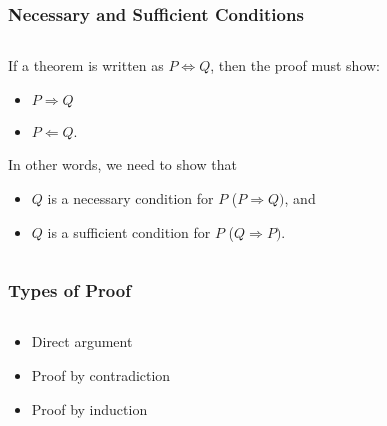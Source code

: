 \documentclass{beamer}
\begin{document}
\begin{frame}
\frametitle{Necessary and Sufficient Conditions}	
\begin{columns}
\begin{column}{0.5\textwidth}
   If a theorem is written as $P \iff Q$, then the proof must show:
   \begin{itemize}
   \item $P \Rightarrow Q$  \\
   \item $P \Leftarrow Q$.	
   \end{itemize}
   In other words, we need to show that
   \begin{itemize}
   \item $Q$ is a necessary condition for $P$ ($P\Rightarrow Q)$, and
   \item $Q$ is a sufficient condition for $P$ ($Q\Rightarrow P)$.
   \end{itemize}


\end{column}
\begin{column}{0.5\textwidth}  
\end{column}
\end{columns}
\end{frame}

\begin{frame}
\frametitle{Types of Proof}	
\begin{columns}
\begin{column}{0.5\textwidth}
   \begin{itemize}
   \item Direct argument	
   \item Proof by contradiction
   \item Proof by induction
   \end{itemize}

\end{column}
\begin{column}{0.5\textwidth}  
\end{column}
\end{columns}
\end{frame}

\begin{frame}
\frametitle{}	
\begin{columns}
\begin{column}{0.5\textwidth}
\end{column}
\begin{column}{0.5\textwidth}  
\end{column}
\end{columns}
\end{frame}
\end{document}
